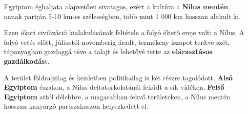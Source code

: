 \begin{figure}[H]
	\centering
	\captionsetup{labelformat=empty}
	\caption{}
\end{figure}

Egyiptom éghaljata alapvetően sivatagos, ezért a kultúra a \textbf{Nílus mentén}, annak partján 5-10 km-es szélességben, több mint 1 000 km hosszan alakult ki.

Ezen ókori civilizáció kialakulásának feltétele a folyó éltető ereje volt: a Nílus. A folyó vetés előtt, júliustól novemberig áradt, termékeny iszapot terítve szét, tápanyagban gazdaggá téve a talajt és lehetővé tette az \textbf{elárasztásos gazdálkodás}t.

A terület földrajzilag és kezdetben politikailag is két részre tagolódott. \textbf{Alsó Egyiptom} északon, a Nílus deltatorkolatánál feküdt a sík vidéken. \textbf{Felső Egyiptom} attól délebbre, a magasabban fekvő területeken, a Nílus mentén hosszan kanyargó partszakaszon helyezkedett el.

